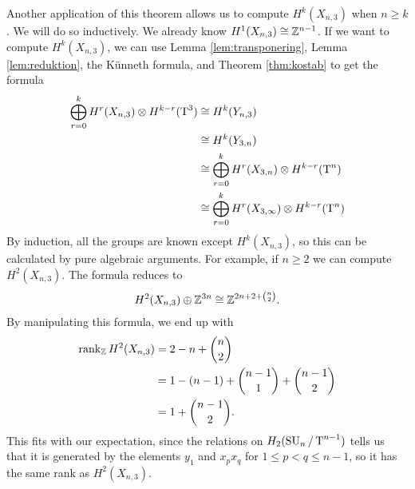 \begin{example}
  Another application of this theorem allows us to compute
  $H^k(X_{n,3})$ when $n \geq k$. We will do so inductively. We
  already know $H^1(X_{n,3}) \cong \mathbb{Z}^{n-1}$. If we want to compute
  $H^k(X_{n,3})$, we can use Lemma \ref{lem:transponering}, Lemma
  \ref{lem:reduktion}, the K\"unneth formula, and Theorem
  \ref{thm:kostab} to get the formula
  \begin{align*}
    \bigoplus_{r=0}^k H^r(X_{n,3}) \otimes H^{k-r}(\operatorname{T}^3) 
    &\cong H^k(Y_{n,3}) \\
    &\cong H^k(Y_{3,n}) \\
    &\cong \bigoplus_{r=0}^k H^r(X_{3,n}) \otimes H^{k-r}(\operatorname{T}^n) \\
    &\cong \bigoplus_{r=0}^k H^r(X_{3,\infty}) \otimes H^{k-r}(\operatorname{T}^n)
  \end{align*}
  By induction, all the groups are known except $H^k(X_{n,3})$, so
  this can be calculated by pure algebraic arguments. For example, if
  $n \geq 2$ we can compute $H^2(X_{n,3})$. The formula reduces to
  \[ H^2(X_{n,3}) \oplus \mathbb{Z}^{3n} \cong \mathbb{Z}^{2n+2+{n\choose 2}}. \]
  By manipulating this formula, we end up with
  \begin{align*}
    \operatorname{rank}_{\mathbb{Z}} H^2(X_{n,3}) &= 2 - n + {n\choose 2} \\
                        &= 1 - (n-1) + {n-1 \choose 1} + {n-1 \choose
                          2} \\
                        &= 1 + {n-1 \choose 2}.
  \end{align*}
  This fits with our expectation, since the relations on
  $H_2(\operatorname{SU}_{n}/\operatorname{T}^{n-1})$
  tells us that it is generated by the elements $y_1$ and $x_p x_q$
  for $1\leq p<q\leq n-1$, so it has the same rank as $H^2(X_{n,3})$.
\end{example}

